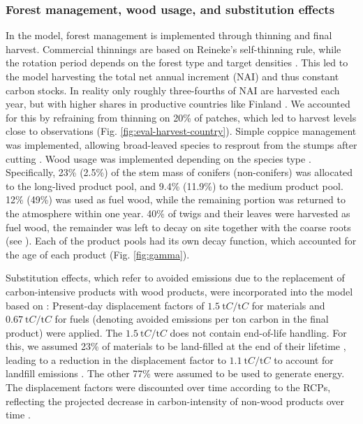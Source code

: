 \documentclass[]{article}
\begin{document}
\subsubsection{Forest management, wood usage, and substitution effects}\label{sec:forestry}
In the model, forest management is implemented through thinning and final harvest. Commercial thinnings are based on Reineke's self-thinning rule, while the rotation period depends on the forest type and target densities \parencite{Reineke1933, Lindeskog2021}.
This led to the model harvesting the total net annual increment (NAI) and thus constant carbon stocks. In reality only roughly three-fourths of NAI are harvested each year, but with higher shares in productive countries like Finland \parencite{FORESTEUROPE2020}. We accounted for this by refraining from thinning on 20\% of patches, which led to harvest levels close to observations (Fig. \ref{fig:eval-harvest-country}).
Simple coppice management was implemented, allowing broad-leaved species to resprout from the stumps after cutting \parencite{Gregor2022}.
Wood usage was implemented depending on the species type \parencite{EUROSTAT2023a}. Specifically, 23\% (2.5\%) of the stem mass of conifers (non-conifers) was allocated to the long-lived product pool, and 9.4\% (11.9\%) to the medium product pool. 12\% (49\%) was used as fuel wood, while the remaining portion was returned to the atmosphere within one year.
40\% of twigs and their leaves were harvested as fuel wood, the remainder was left to decay on site together with the coarse roots (see \textcite{Lindeskog2021}).
Each of the product pools had its own decay function, which accounted for the age of each product (Fig. \ref{fig:gamma}).

Substitution effects, which refer to avoided emissions due to the replacement of carbon-intensive products with wood products, were incorporated into the model based on \textcite{Knauf2015}: Present-day displacement factors of $\SI{1.5}{\tonne{C}\per\tonne{C}}$ for materials and $\SI{0.67}{\tonne{C}\per\tonne{C}}$ for fuels (denoting avoided emissions per ton carbon in the final product) were applied.
The $\SI{1.5}{\tonne{C}\per\tonne{C}}$ does not contain end-of-life handling. For this, we assumed 23\% of materials to be land-filled at the end of their lifetime \parencite{EurostatWaste2023}, leading to a reduction in the displacement factor to $\SI{1.1}{\tonne{C}\per\tonne{C}}$ to account for landfill emissions \parencite{Sathre2010}. The other 77\% were assumed to be used to generate energy.
The displacement factors were discounted over time according to the RCPs, reflecting the projected decrease in carbon-intensity of non-wood products over time \parencite{BrunetNavarro2021,Gregor2022}.
\end{document}
